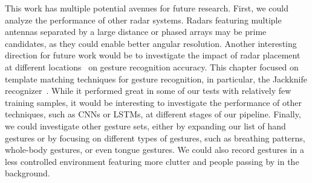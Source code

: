This work has multiple potential avenues for future research.
%
First, we could analyze the performance of other radar systems. Radars featuring multiple antennas separated by a large distance or phased arrays may be prime candidates, as they could enable better angular resolution.
%
Another interesting direction for future work would be to investigate the impact of radar placement at different locations~\cite{Siean:2022} on gesture recognition accuracy.
%
This chapter focused on template matching techniques for gesture recognition, in particular, the Jackknife recognizer~\cite{Taranta:2017}. While it performed great in some of our tests with relatively few training samples, it would be interesting to investigate the performance of other techniques, such as CNNs or LSTMs, at different stages of our pipeline.
%
Finally, we could investigate other gesture sets, either by expanding our list of hand gestures or by focusing on different types of gestures, such as breathing patterns, whole-body gestures, or even tongue gestures. 
%
We could also record gestures in a less controlled environment featuring more clutter and people passing by in the background.